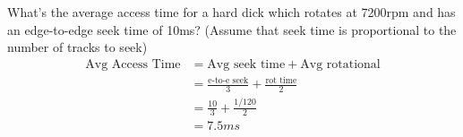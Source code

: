 What's the average access time for a hard dick which rotates at 7200rpm and has an edge-to-edge seek time of 10ms? (Assume that seek time is proportional to the number of tracks to seek)
\begin{align*}
	\text{Avg Access Time} &= \text{Avg seek time} + \text{Avg rotational}\\
	&= \frac{\text{e-to-e seek}}{3} + \frac{\text{rot time}}{2}\\
	&= \frac{10}{3} + \frac{1/120}{2}\\
	&= 7.5ms
\end{align*}


